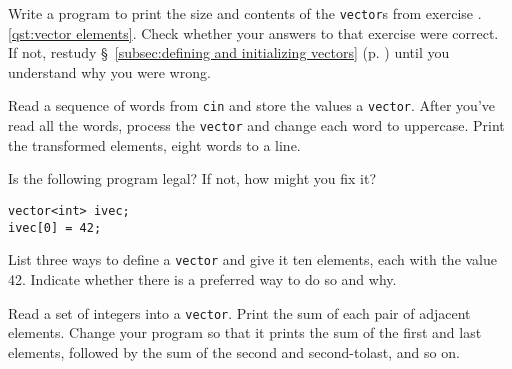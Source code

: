 %
%
\begin{question}
Write a program to print the size and contents of the
\verb|vector|s from exercise \thechapter.\ref{qst:vector elements}. Check whether your answers to that exercise
were correct. If not, restudy \S~\ref{subsec:defining and initializing vectors} (p. \pageref{subsec:defining and initializing vectors}) until you understand why you
were wrong.
\end{question}

\begin{question}
Read a sequence of words from \verb|cin| and store the values a
\verb|vector|. After you’ve read all the words, process the \verb|vector| and change
each word to uppercase. Print the transformed elements, eight words to a
line.
\end{question}

\begin{question}
Is the following program legal? If not, how might you fix it?
\begin{lstlisting}
vector<int> ivec;
ivec[0] = 42;
\end{lstlisting}
\end{question}

\begin{question}
List three ways to define a \verb|vector| and give it ten elements,
each with the value 42. Indicate whether there is a preferred way to do so
and why.
\end{question}

\begin{question}
Read a set of integers into a \verb|vector|. Print the sum of each
pair of adjacent elements. Change your program so that it prints the sum of
the first and last elements, followed by the sum of the second and second-tolast,
and so on.
\end{question}
